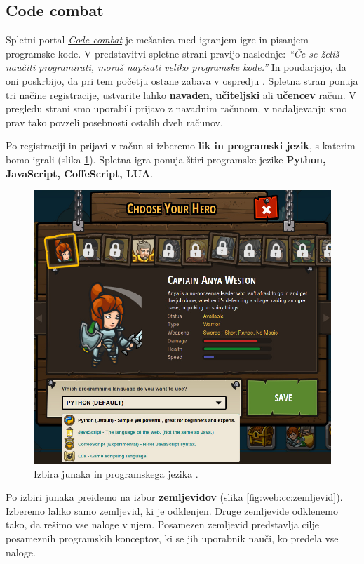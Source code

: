 \subsection{Code combat}
\label{sec:code_battle}

Spletni portal \emph{\href{https://codecombat.com/}{Code combat}}
\cite{web:codecombat} je mešanica med igranjem igre in pisanjem
programske kode. V predstavitvi spletne strani pravijo naslednje:
\emph{``Če se želiš naučiti programirati, moraš napisati veliko
  programske kode.''} In poudarjajo, da oni poskrbijo, da pri tem
početju ostane zabava v ospredju \cite{web:codecombat:about}. Spletna
stran ponuja tri načine registracije, ustvarite lahko
\textbf{navaden}, \textbf{učiteljski} ali \textbf{učencev} račun. V
pregledu strani smo uporabili prijavo z navadnim računom, v
nadaljevanju smo prav tako povzeli posebnosti ostalih dveh računov.

Po registraciji in prijavi v račun si izberemo \textbf{lik in
  programski jezik}, s katerim bomo igrali (slika
\ref{fig:web:cc:hero}). Spletna igra ponuja štiri programske jezike
\textbf{Python, JavaScript, CoffeScript, LUA}. 

\begin{figure}[h!]
  \centering
    \includegraphics [width=0.45\linewidth, keepaspectratio =
   1] {./images/sc_web/cc_hero-lang-v01.jpg}
   \caption{Izbira junaka in programskega jezika \cite{web:codecombat}.}
   \label{fig:web:cc:hero}
 \end{figure}


 Po izbiri junaka preidemo na izbor \textbf{zemljevidov} (slika
 \ref{fig:web:cc:zemljevid}). Izberemo lahko samo zemljevid, ki je
 odklenjen. Druge zemljevide odklenemo tako, da rešimo vse naloge v
 njem. Posamezen zemljevid predstavlja cilje posameznih programskih
 konceptov, ki se jih uporabnik nauči, ko predela vse naloge.

